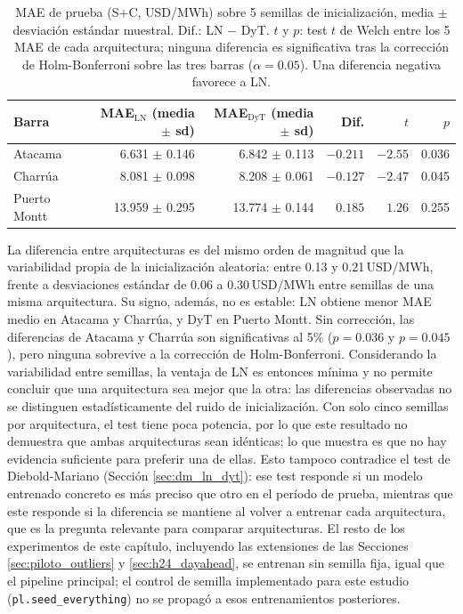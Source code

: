 \begin{table}[htbp]
    \centering
    \small
    \setlength{\tabcolsep}{4pt}
    \begin{tabular}{lrrrrr}
        \toprule
        Barra & MAE$_\text{LN}$ (media $\pm$ sd) & MAE$_\text{DyT}$ (media $\pm$ sd) & Dif. & $t$ & $p$ \\
        \midrule
        Atacama      & 6.631 $\pm$ 0.146  & 6.842 $\pm$ 0.113  & $-0.211$ & $-2.55$ & 0.036 \\
        Charrúa      & 8.081 $\pm$ 0.098  & 8.208 $\pm$ 0.061  & $-0.127$ & $-2.47$ & 0.045 \\
        Puerto Montt & 13.959 $\pm$ 0.295 & 13.774 $\pm$ 0.144 & $0.185$  & $1.26$  & 0.255 \\
        \bottomrule
    \end{tabular}
    \vspace{0.2cm}
    \caption{MAE de prueba (S+C, USD/MWh) sobre 5 semillas de inicialización, media $\pm$ desviación estándar muestral. Dif.: LN $-$ DyT. $t$ y $p$: test $t$ de Welch entre los 5 MAE de cada arquitectura; ninguna diferencia es significativa tras la corrección de Holm-Bonferroni sobre las tres barras ($\alpha=0.05$). Una diferencia negativa favorece a LN.}
    \label{tab:5seeds}
\end{table}

La diferencia entre arquitecturas es del mismo orden de magnitud que la variabilidad propia de la inicialización aleatoria: entre 0.13 y 0.21\,USD/MWh, frente a desviaciones estándar de 0.06 a 0.30\,USD/MWh entre semillas de una misma arquitectura. Su signo, además, no es estable: LN obtiene menor MAE medio en Atacama y Charrúa, y DyT en Puerto Montt. Sin corrección, las diferencias de Atacama y Charrúa son significativas al 5\% ($p=0.036$ y $p=0.045$), pero ninguna sobrevive a la corrección de Holm-Bonferroni. Considerando la variabilidad entre semillas, la ventaja de LN es entonces mínima y no permite concluir que una arquitectura sea mejor que la otra: las diferencias observadas no se distinguen estadísticamente del ruido de inicialización. Con solo cinco semillas por arquitectura, el test tiene poca potencia, por lo que este resultado no demuestra que ambas arquitecturas sean idénticas; lo que muestra es que no hay evidencia suficiente para preferir una de ellas. Esto tampoco contradice el test de Diebold-Mariano (Sección \ref{sec:dm_ln_dyt}): ese test responde si un modelo entrenado concreto es más preciso que otro en el período de prueba, mientras que este responde si la diferencia se mantiene al volver a entrenar cada arquitectura, que es la pregunta relevante para comparar arquitecturas. El resto de los experimentos de este capítulo, incluyendo las extensiones de las Secciones \ref{sec:piloto_outliers} y \ref{sec:h24_dayahead}, se entrenan sin semilla fija, igual que el pipeline principal; el control de semilla implementado para este estudio (\texttt{pl.seed\_everything}) no se propagó a esos entrenamientos posteriores.

